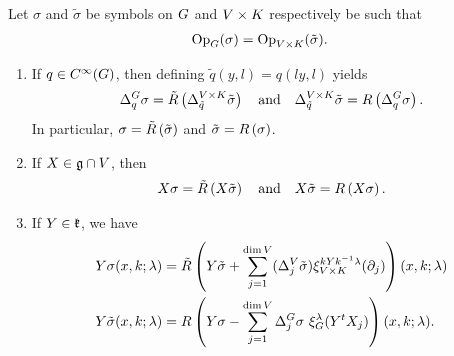 \begin{lemma}
\label{lemma:link_between_symbols}
    Let $\sigma$ and $\tilde \sigma$ be symbols on $\Group$ and $\GroupDirect$ respectively be such that
    \begin{align*}
        \Op[\Group] (\sigma) = \Op[\GroupDirect] (\tilde \sigma).
    \end{align*}
    \begin{enumerate}
        \item
            \label{item:action_of_difference_operators}
            If $q \in \SmoothFunctions \Group$,
            then defining $\tilde q(y, l) = q(l y, l)$ yields
            \begin{align*}
                \DifferenceOperator{q} \sigma = \Rotation {\DifferenceOperator[\GroupDirect]{\tilde q} \tilde \sigma}
                \quad \text{and} \quad
                \DifferenceOperator[\GroupDirect]{\tilde q} \tilde \sigma = \InverseRotation {\DifferenceOperator{q} \sigma}.
            \end{align*}
            In particular, $\sigma = \Rotation {\tilde \sigma}$ and $\tilde \sigma = \InverseRotation \sigma$.
        \item
            \label{item:action_of_Euclidean_derivative}
            If $X \in \LieAlgebra \cap \VectorSpace$, then
            \begin{align*}
                \LeftDifferentialOperatorFirstOrder{X} \sigma
                = \Rotation {\LeftDifferentialOperatorFirstOrder{X} \tilde \sigma}
                \quad \text{and} \quad
                \LeftDifferentialOperatorFirstOrder{X} \tilde \sigma
                = \InverseRotation {\LeftDifferentialOperatorFirstOrder{X} \sigma}.
            \end{align*}
        \item
            \label{item:action_of_K-derivative}
            If $Y \in \LieAlgebraCompactGroup$, we have
            \begin{align*}
                \LeftDifferentialOperatorFirstOrder{Y} \sigma(x, k; \lambda)
                &= \Rotation {
                    \LeftDifferentialOperatorFirstOrder{Y} \tilde \sigma
                    + \sum_{j = 1}^{\dim \VectorSpace} (\DifferenceOperator[\VectorSpace]{j} \tilde \sigma) \Rep[\GroupDirect] {k Y k^{-1} \lambda} (\partial_j)
                }(x, k; \lambda)\\
                \LeftDifferentialOperatorFirstOrder Y \tilde \sigma(x, k; \lambda)
                &= \InverseRotation {\LeftDifferentialOperatorFirstOrder Y \sigma
                - \sum_{j = 1}^{\dim \VectorSpace} \DifferenceOperator{j} \sigma \ \Rep \lambda (Y^t X_j)
                }(x, k; \lambda).
            \end{align*}
    \end{enumerate}
\end{lemma}
